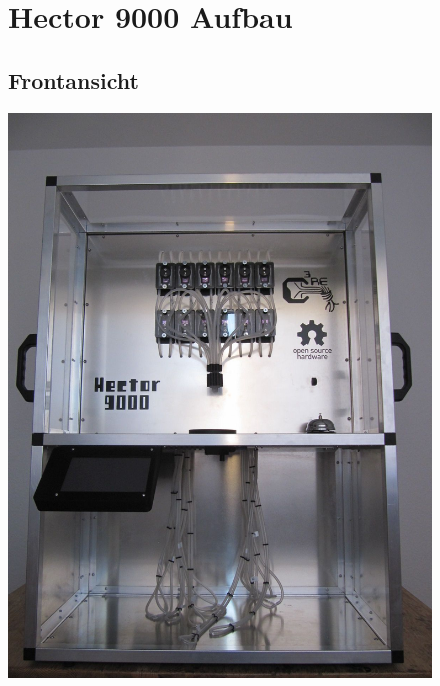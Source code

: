 \documentclass[12pt,letterpaper]{article}
\begin{document}
	
	\begin{figure}
	\section{Hector 9000 Aufbau}
	\subsection{Frontansicht}
	\begin{center}
	\includegraphics[scale=0.5]{"hector9000-vorne.jpeg"}	
	\end{center}



\end{figure}
\end{document}
